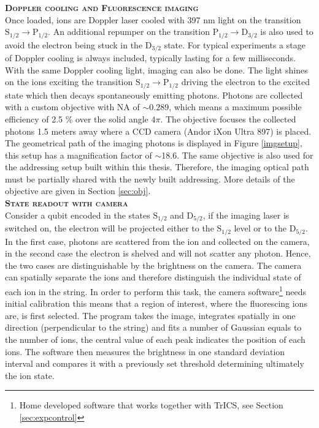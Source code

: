 \textbf{\textsc{Doppler cooling and Fluorescence imaging}}\\
Once loaded, ions are Doppler laser cooled with 397 nm light on the transition $\text{S}_{1/2} \to \text{P}_{1/2}$. An additional repumper on the transition $\text{P}_{1/2} \to \text{D}_{3/2}$ is also used to avoid the electron being stuck in the $\text{D}_{3/2}$ state. For typical experiments a stage of Doppler cooling is always included, typically lasting for a few milliseconds.\\
With the same Doppler cooling light, imaging can also be done. The light shines on the ions exciting the transition $\text{S}_{1/2} \to \text{P}_{1/2}$ driving the electron to the excited state which then decays spontaneously emitting photons. Photons are collected with a custom objective with NA of $\sim 0.289$, which means a maximum possible efficiency of 2.5 \% over the solid angle $4\pi$. The objective focuses the collected photons 1.5 meters away where a CCD camera (Andor iXon Ultra 897) is placed. The geometrical path of the imaging photons is displayed in Figure \ref{imgsetup}, this setup has a magnification factor of $\sim$18.6. The same objective is also used for the addressing setup built within this thesis. Therefore, the imaging optical path must be partially shared with the newly built addressing. More details of the objective are given in Section \ref{sec:obj}.\vspace{.5em}\\
\textbf{\textsc{State readout with camera}}\\
Consider a qubit encoded in the states $\text{S}_{1/2}$ and $\text{D}_{5/2}$, if the imaging laser is switched on, the electron will be projected either to the $\text{S}_{1/2}$ level or to the $\text{D}_{5/2} $. In the first case, photons are scattered from the ion and collected on the camera, in the second case the electron is shelved and will not scatter any photon. Hence, the two cases are distinguishable by the brightness on the camera. The camera can spatially separate the ions and therefore distinguish the individual state of each ion in the string. In order to perform this task, the camera software\footnote{Home developed software that works together with TrICS, see Section \ref{sec:expcontrol}} needs initial calibration this means that a region of interest, where the fluorescing ions are, is first selected. The program takes the image, integrates spatially in one direction (perpendicular to the string) and fits a number of Gaussian equals to the number of ions, the central value of each peak indicates the position of each ions. The software then measures the brightness in one standard deviation interval and compares it with a previously set threshold determining ultimately the ion state.

